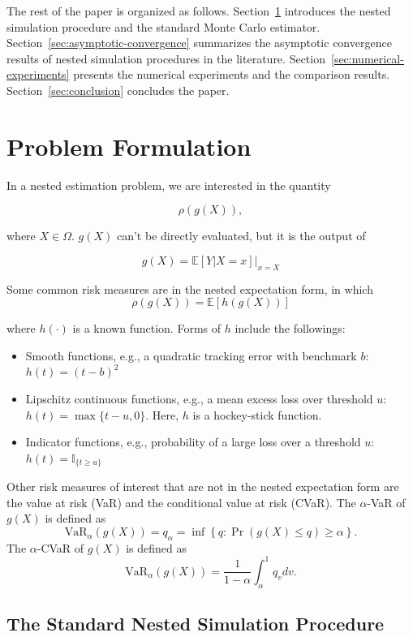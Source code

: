 \documentclass{article}
\begin{document}
The rest of the paper is organized as follows.
Section~\ref{sec:problem-formulation} introduces the nested simulation procedure and the standard Monte Carlo estimator.
Section~\ref{sec:asymptotic-convergence} summarizes the asymptotic convergence results of nested simulation procedures in the literature.
Section~\ref{sec:numerical-experiments} presents the numerical experiments and the comparison results.
Section~\ref{sec:conclusion} concludes the paper.

\section{Problem Formulation} \label{sec:problem-formulation}

In a nested estimation problem, we are interested in the quantity 

$$\rho(g(X)), $$

where $X \in \Omega$. 
$g(X)$ can't be directly evaluated, but it is the output of 

$$ g(X) = \mathbb{E}\left[ Y|X=x \right]\vert_{x=X} $$

Some common risk measures are in the nested expectation form, in which 
$$\rho(g(X)) = \mathbb{E}\left[ h(g(X)) \right]$$

where $h(\cdot)$ is a known function. 
Forms of $h$ include the followings:
\begin{itemize}
    \item 	Smooth functions, e.g., a quadratic tracking error with benchmark $b$: $h(t) = (t - b)^2$
    \item 	Lipschitz continuous functions, e.g., a mean excess loss over threshold $u$: $h(t) = \max\{t - u, 0\}$. Here, $h$ is a hockey-stick function.
    \item 	Indicator functions, e.g., probability of a large loss over a threshold $u$: $h(t) = \mathbb{I}_{\{t \geqslant u\}}$
\end{itemize}

Other risk measures of interest that are not in the nested expectation form are the value at risk (VaR) and the conditional value at risk (CVaR). 
The $\alpha$-VaR of $g(X)$ is defined as
$$
    \mbox{VaR}_\alpha(g(X)) = q_\alpha = \inf \left\{ q: \Pr(g(X)\leq q) \geq \alpha \right\}.
$$
The $\alpha$-CVaR of $g(X)$ is defined as
$$
    \mbox{VaR}_\alpha(g(X)) =\frac{1}{1-\alpha} \int_{\alpha}^{1} q_v dv. 
$$

\subsection{The Standard Nested Simulation Procedure}
\end{document}

